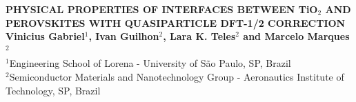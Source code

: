 \documentclass[a0,portrait]{a0poster}
\begin{document}
\vspace{30cm}

\begin{minipage}[b]{1.0\linewidth} %
\begin{center}

\vspace{1cm}
\Huge \textbf{PHYSICAL PROPERTIES OF INTERFACES BETWEEN TiO$_2$ AND PEROVSKITES WITH QUASIPARTICLE DFT-1/2 CORRECTION}\\


\LARGE \textbf{Vinicius Gabriel$^{1}$, Ivan Guilhon$^{2}$, Lara K. Teles$^{2}$ and Marcelo Marques$^{2}$}\\

\normalsize $^1$Engineering School of Lorena - University of São Paulo, SP, Brazil\\
\normalsize $^2$Semiconductor Materials and Nanotechnology Group - Aeronautics Institute of Technology, SP, Brazil\\[0.1cm]

\end{center}
\end{minipage}
%
\vspace{0.5cm} %

\vspace{-2.5cm}


\vspace{1cm}
\end{document}
